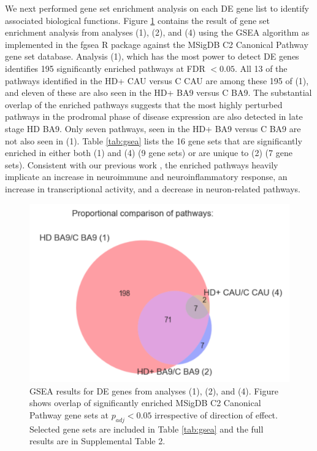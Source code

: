 \documentclass[fleqn,10pt,table]{wlscirep}
\begin{document}
We next performed gene set enrichment analysis on each DE gene list to identify associated biological functions.
Figure \ref{fig:gsea} contains the result of gene set enrichment analysis from analyses (1), (2), and (4) using the GSEA \cite{Subramanian2005-tj} algorithm as implemented in the fgsea R package \cite{Sergushichev2016-hz} against the MSigDB C2 Canonical Pathway gene set database\cite{Subramanian2005-tj,Liberzon2011-ax}.
Analysis (1), which has the most power to detect DE genes identifies 195 significantly enriched pathways at FDR $< 0.05$.
All 13 of the pathways identified in the HD+ CAU versus C CAU are among these 195 of (1), and eleven of these are also seen in the HD+ BA9 versus C BA9.
The substantial overlap of the enriched pathways suggests that the most highly perturbed pathways in the prodromal phase of disease expression are also detected in late stage HD BA9.
Only seven pathways, seen in the HD+ BA9 versus C BA9 are not also seen in (1).
Table \ref{tab:gsea} lists the 16 gene sets that are significantly enriched in either both (1) and (4) (9 gene sets) or are unique to (2) (7 gene sets).
Consistent with our previous work \cite{Labadorf2017-qb}, the enriched pathways heavily implicate an increase in neuroimmune and neuroinflammatory response, an increase in transcriptional activity, and a decrease in neuron-related pathways.

\begin{figure}[ht]
\centering
\includegraphics[width=0.5\linewidth]{Venn_fgsea_pathway.png}
\caption{GSEA results for DE genes from analyses (1), (2), and (4). Figure shows overlap of significantly enriched MSigDB C2 Canonical Pathway gene sets at $p_{adj} < 0.05$ irrespective of direction of effect. Selected gene sets are included in Table \ref{tab:gsea} and the full results are in Supplemental Table 2.
\label{fig:gsea}}
\end{figure}
\end{document}
